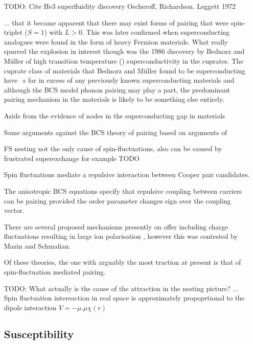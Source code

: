 TODO: Cite He3 superfluidity discovery Oscheroff, Richardson. Leggett 1972

... that it became apparent that there may exist forms of pairing that were spin-triplet ($S=1$) with $L>0$. This was later confirmed when superconducting analogues were found in the form of heavy Fermion materials. What really spurred the explosion in interest though was the 1986 discovery by Bednorz and M\"uller\cite{Bednorz} of high transition temperature (\Tc) superconductivity in the cuprates. The cuprate class of materials that Bednorz and M\"uller found to be superconducting have \Tc~s far in excess of any previously known superconducting materials and although the BCS model phonon pairing may play a part, the predominant pairing mechanism in the \highTc materials is likely to be something else entirely.

Aside from the evidence of nodes in the superconducting gap in materials 

Some arguments against the BCS theory of pairing \cite{Haule2008,Yndurain2009,Mazin2008} based on arguments of 


FS nesting not the only cause of spin-fluctuations, also can be caused by frustrated superexchange for example TODO

Spin fluctuations mediate a repulsive interaction between Cooper pair candidates.

The anisotropic BCS equations specify that repulsive coupling between carriers can be pairing provided the order parameter changes sign over the coupling vector.


There are several proposed mechanisms presently on offer including charge fluctuations resulting in large ion polarisation \cite{Berciu2009}, however this was contested by Mazin and Schmalian\cite{Mazin2009}.


Of these theories, the one with arguably the most traction at present is that of spin-fluctuation mediated pairing. 

TODO: What actually is the cause of the attraction in the nesting picture? ... Spin fluctuation intereaction in real space is approximately propoprtional to the dipole interaction $V=-\mu . \mu \chi(r)$\cite{Bergemann2003} 

\subsection{Susceptibility}
    \label{Sec:1:NestingSusceptibility}

